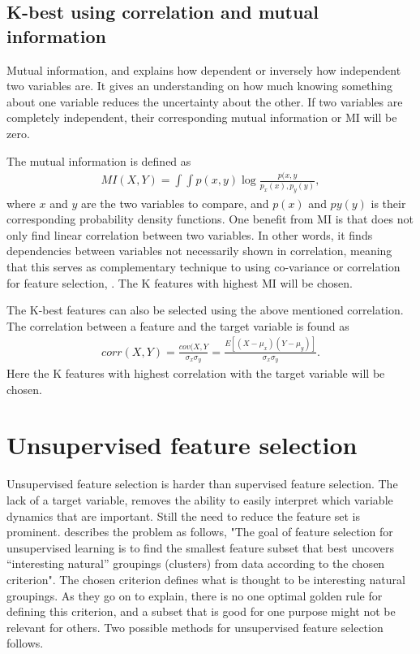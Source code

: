    
    \subsection{K-best using correlation and  mutual information}\label{subsec:K-best_feat_select}
    
        Mutual information, \cite{Kraskov2004} and \cite{Peng2005} explains how dependent or inversely how independent two variables are. It gives an understanding on how much knowing something about one variable reduces the uncertainty about the other. If two variables are completely independent, their corresponding mutual information or MI will be zero. 
        
        The mutual information is defined as
        \begin{align}\label{eq:tech_MI}
                MI(X,Y) = \int \int p(x,y) \log \frac{p(x,y}{p_x(x),p_y(y)},
        \end{align}
        where $x$ and $y$ are the two variables to compare, and $p(x)$ and $py(y)$ is their corresponding probability density functions. One benefit from MI is that does not only find linear correlation between two variables. In other words, it finds dependencies between variables not necessarily shown in correlation, meaning that this serves as complementary technique to using co-variance or correlation for feature selection, \cite{Li}. The K features with highest MI will be chosen. 
        
        
        The K-best features can also be selected using the above mentioned correlation. The correlation between a feature and the target variable is found as  
        \begin{align}
            corr(X,Y) = \frac{cov(X,Y}{\sigma_x\sigma_y} = \frac{E[(X-\mu_x)(Y-\mu_y)]}{\sigma_x\sigma_y}.
        \end{align}
        Here the K features with highest correlation with the target variable will be chosen. 
        
\section{Unsupervised feature selection}\label{sec:unsup_feat_reduc}
    Unsupervised feature selection is harder than supervised feature selection. The lack of a target variable, removes the ability to easily interpret which variable dynamics that are important. Still the need to reduce the feature set is prominent. \cite{Dy2004} describes the problem as follows, "The goal of feature selection for unsupervised learning is to find the smallest feature subset that best uncovers “interesting natural” groupings (clusters) from data according to the chosen criterion". The chosen criterion defines what is thought to be interesting natural groupings. As they go on to explain, there is no one optimal golden rule for defining this criterion, and a subset that is good for one purpose might not be relevant for others. Two possible methods for unsupervised feature selection follows.
    
